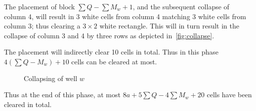 The placement of block $\sum Q - \sum M_w + 1$, and the subsequent collapse of column 4, will result in 3 white cells from column 4 matching 3 white cells from column 3; thus clearing a $3 \times 2$ white rectangle. This will in turn result in the collapse of column 3 and 4 by three rows as depicted in~\autoref{fig:collapse}. 

The placement will indirectly clear 10 cells in total. Thus in this phase $4 \left( \sum Q - M_w \right) + 10$ cells can be cleared at most.

\begin{figure}[H]
    \centering
    \caption{Collapsing of well $w$}
    \label{fig:collapse}
\end{figure}

Thus at the end of this phase, at most $8a + 5 \sum Q - 4 \sum M_w + 20$ cells have been cleared in total.
